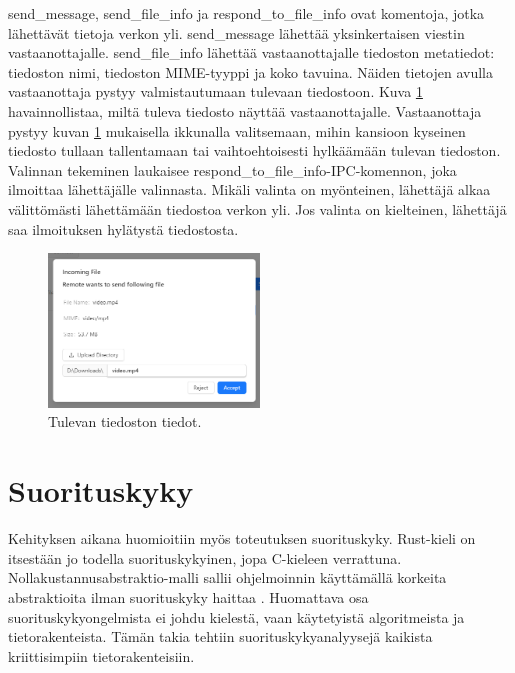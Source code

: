 \documentclass[a4paper,12pt]{article}
\begin{document}
    send\_message, send\_file\_info ja respond\_to\_file\_info ovat komentoja, jotka lähettävät tietoja verkon yli. send\_message lähettää yksinkertaisen viestin vastaanottajalle.
    send\_file\_info lähettää vastaanottajalle tiedoston metatiedot: tiedoston nimi, tiedoston MIME-tyyppi ja koko tavuina. Näiden tietojen avulla vastaanottaja pystyy valmistautumaan tulevaan tiedostoon. Kuva \ref{fig:incoming_file} havainnollistaa, miltä tuleva tiedosto näyttää vastaanottajalle. Vastaanottaja pystyy kuvan \ref{fig:incoming_file} mukaisella ikkunalla valitsemaan, mihin kansioon kyseinen tiedosto tullaan tallentamaan tai vaihtoehtoisesti hylkäämään tulevan tiedoston. Valinnan tekeminen laukaisee respond\_to\_file\_info-IPC-komennon, joka ilmoittaa lähettäjälle valinnasta.
    Mikäli valinta on myönteinen, lähettäjä alkaa välittömästi lähettämään tiedostoa verkon yli. Jos valinta on kielteinen, lähettäjä saa ilmoituksen hylätystä tiedostosta.

    \begin{figure}[h!]
        \centering
        \includegraphics[width=0.5\textwidth]{doc/latex/src/images/incoming_file.png}
        \caption{Tulevan tiedoston tiedot.}
        \label{fig:incoming_file}
    \end{figure}

    \section{Suorituskyky}\label{sec:suorityskyky}
    Kehityksen aikana huomioitiin myös toteutuksen suorituskyky. Rust-kieli on itsestään jo todella suorituskykyinen, jopa C-kieleen verrattuna. Nollakustannusabstraktio-malli sallii ohjelmoinnin käyttämällä korkeita abstraktioita ilman suorituskyky haittaa \cite{Codex2023UnderstandingAbstractions}. Huomattava osa suorituskykyongelmista ei johdu kielestä, vaan käytetyistä algoritmeista ja tietorakenteista. Tämän takia tehtiin suorituskykyanalyysejä kaikista kriittisimpiin tietorakenteisiin.   
\end{document}
